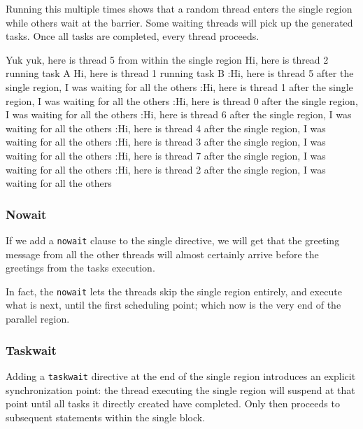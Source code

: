 Running this multiple times shows that a random thread enters the single region while others wait at the barrier. Some waiting threads will pick up the generated tasks. Once all tasks are completed, every thread proceeds.

\begin{codeblock}[language = {}, numbers=none, basicstyle=\ttfamily\scriptsize]
 Yuk yuk, here is thread 5 from within the single region
	Hi, here is thread 2 running task A
	Hi, here is thread 1 running task B
 :Hi, here is thread 5 after the single region, I was waiting for all the others
 :Hi, here is thread 1 after the single region, I was waiting for all the others
 :Hi, here is thread 0 after the single region, I was waiting for all the others
 :Hi, here is thread 6 after the single region, I was waiting for all the others
 :Hi, here is thread 4 after the single region, I was waiting for all the others
 :Hi, here is thread 3 after the single region, I was waiting for all the others
 :Hi, here is thread 7 after the single region, I was waiting for all the others
 :Hi, here is thread 2 after the single region, I was waiting for all the others
\end{codeblock}

\subsubsection{Nowait}

If we add a \texttt{nowait} clause to the single directive, we will get that the greeting message from all the other threads will almost certainly arrive before the greetings from the tasks execution.

\begin{codeblock}[language = C, morekeywords={pragma}]
#pragma omp parallel
{
    #pragma omp single nowait
    {
    ...
\end{codeblock}

In fact, the \texttt{nowait} lets the threads skip the single region entirely, and execute what is next, until the first scheduling point; which now is the very end of the parallel region.

\subsubsection{Taskwait}

Adding a \texttt{taskwait} directive at the end of the single region introduces an explicit synchronization point: the thread executing the single region will suspend at that point until all tasks it directly created have completed. Only then proceeds to subsequent statements within the single block.


